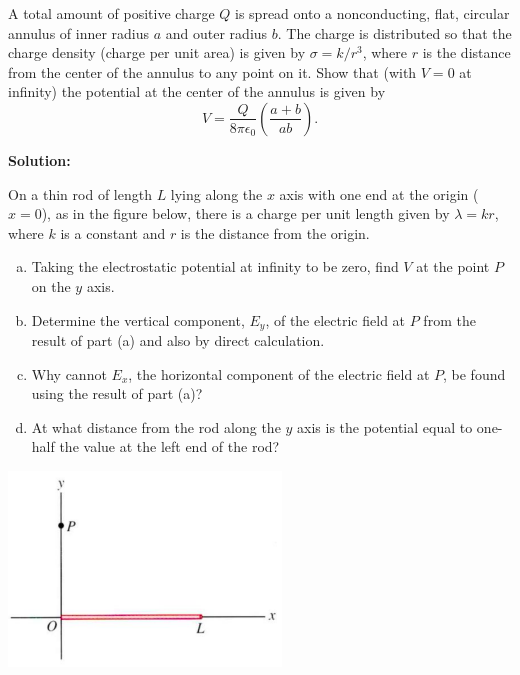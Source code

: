 \documentclass[11pt]{article}
\newcommand{\be}{\begin{enumerate}[a) ]}
\newcommand{\ee}{\end{enumerate}}
\newcommand{\pn}[1]{\left( #1 \right)}
\begin{document}
\vspace*{0.25in}


\begin{problem}[(P28.10)*]
A total amount of positive charge $Q$ is spread onto a nonconducting, flat, circular annulus of inner radius $a$ and outer radius $b$. The charge is distributed so that the charge density (charge per unit area) is given by $\sigma = k/r^3$, where $r$ is the distance from the center of the annulus to any point on it. Show that (with $V=0$ at infinity) the potential at the center of the annulus is given by
\[
	V = \frac{Q}{8\pi\epsilon_0} \pn{\frac{a+b}{ab}}.
\]
\end{problem}


\textbf{Solution:}


\clearpage
\begin{problem}[(P28.13)]
On a thin rod of length $L$ lying along the $x$ axis with one end at the origin ($x=0$), as in the figure below, there is a charge per unit length given by $\lambda = kr$, where $k$ is a constant and $r$ is the distance from the origin.
\be
\item Taking the electrostatic potential at infinity to be zero, find $V$ at the point $P$ on the $y$ axis.
\item Determine the vertical component, $E_y$, of the electric field at $P$ from the result of part (a) and also by direct calculation.
\item Why cannot $E_x$, the horizontal component of the electric field at $P$, be found using the result of part (a)?
\item At what distance from the rod along the $y$ axis is the potential equal to one-half the value at the left end of the rod?
\ee
\begin{center}
\includegraphics[scale=0.5]{prob2.png}
\end{center}
\end{problem}
\end{document}
